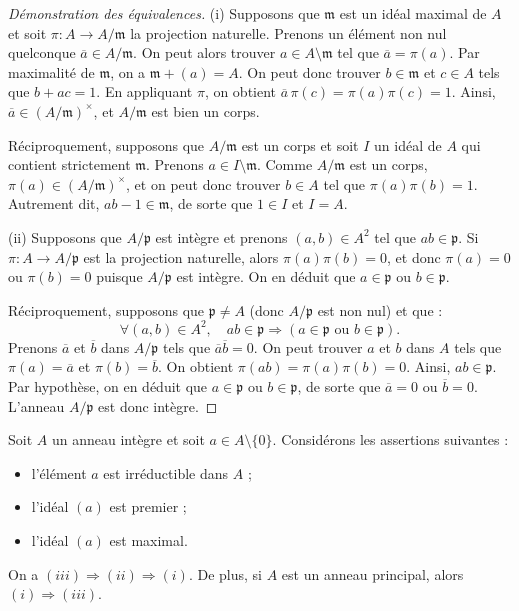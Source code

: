 \documentclass[]{report}
\begin{document}
\begin{proof}[Démonstration des équivalences]
    (i) Supposons que $\mathfrak{m}$ est un idéal maximal de $A$ et soit $\pi : A \to A/\mathfrak{m}$ la projection naturelle. Prenons un élément non nul quelconque $\overline{a} \in A/\mathfrak{m}$. On peut alors trouver $a \in A \setminus \mathfrak{m}$ tel que $\overline{a} = \pi(a)$. Par maximalité de $\mathfrak{m}$, on a $\mathfrak{m} + (a) = A$. On peut donc trouver $b \in \mathfrak{m}$ et $c \in A$ tels que $b + ac = 1$. En appliquant $\pi$, on obtient $\overline{a} \, \pi(c) = \pi(a)\pi(c) = 1$. Ainsi, $\overline{a} \in (A/\mathfrak{m})^{\times}$, et $A/\mathfrak{m}$ est bien un corps.

    Réciproquement, supposons que $A/\mathfrak{m}$ est un corps et soit $I$ un idéal de $A$ qui contient strictement $\mathfrak{m}$. Prenons $a \in I \setminus \mathfrak{m}$. Comme $A/\mathfrak{m}$ est un corps, $\pi(a) \in (A/\mathfrak{m})^{\times}$, et on peut donc trouver $b \in A$ tel que $\pi(a)\pi(b) = 1$. Autrement dit, $ab - 1 \in \mathfrak{m}$, de sorte que $1 \in I$ et $I = A$.

    (ii) Supposons que $A/\mathfrak{p}$ est intègre et prenons $(a, b) \in A^2$ tel que $ab \in \mathfrak{p}$. Si $\pi : A \to A/\mathfrak{p}$ est la projection naturelle, alors $\pi(a)\pi(b) = 0$, et donc $\pi(a) = 0$ ou $\pi(b) = 0$ puisque $A/\mathfrak{p}$ est intègre. On en déduit que $a \in \mathfrak{p}$ ou $b \in \mathfrak{p}$.

    Réciproquement, supposons que $\mathfrak{p} \neq A$ (donc $A/\mathfrak{p}$ est non nul) et que :
    \[\forall (a, b) \in A^2, \quad ab \in \mathfrak{p} \Rightarrow (a \in \mathfrak{p} \text{ ou } b \in \mathfrak{p}).\]
    Prenons $\overline{a}$ et $\overline{b}$ dans $A/\mathfrak{p}$ tels que $\overline{a}\overline{b} = 0$. On peut trouver $a$ et $b$ dans $A$ tels que $\pi(a) = \overline{a}$ et $\pi(b) = \overline{b}$. On obtient $\pi(ab) = \pi(a)\pi(b) = 0$. Ainsi, $ab \in \mathfrak{p}$. Par hypothèse, on en déduit que $a \in \mathfrak{p}$ ou $b \in \mathfrak{p}$, de sorte que $\overline{a} = 0$ ou $\overline{b} = 0$. L'anneau $A/\mathfrak{p}$ est donc intègre.
\end{proof}

\begin{prop}{}{}
    Soit $A$ un anneau intègre et soit $a \in A \setminus \{0\}$. Considérons les assertions suivantes :
    \begin{itemize}
        \item[(i)] l'élément $a$ est irréductible dans $A$ ;
        \item[(ii)] l'idéal $(a)$ est premier ;
        \item[(iii)] l'idéal $(a)$ est maximal.
    \end{itemize}
    On a $(iii) \Rightarrow (ii) \Rightarrow (i)$. De plus, si $A$ est un anneau principal, alors $(i) \Rightarrow (iii)$.
\end{prop}
\end{document}
